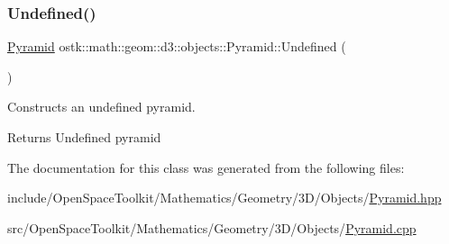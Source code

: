 \subsubsection{\texorpdfstring{Undefined()}{Undefined()}}
{\footnotesize\ttfamily \hyperlink{classostk_1_1math_1_1geom_1_1d3_1_1objects_1_1_pyramid}{Pyramid} ostk\+::math\+::geom\+::d3\+::objects\+::\+Pyramid\+::\+Undefined (\begin{DoxyParamCaption}{ }\end{DoxyParamCaption})\hspace{0.3cm}{\ttfamily [static]}}



Constructs an undefined pyramid. 

\begin{DoxyReturn}{Returns}
Undefined pyramid 
\end{DoxyReturn}


The documentation for this class was generated from the following files\+:\begin{DoxyCompactItemize}
\item 
include/\+Open\+Space\+Toolkit/\+Mathematics/\+Geometry/3\+D/\+Objects/\hyperlink{_pyramid_8hpp}{Pyramid.\+hpp}\item 
src/\+Open\+Space\+Toolkit/\+Mathematics/\+Geometry/3\+D/\+Objects/\hyperlink{_pyramid_8cpp}{Pyramid.\+cpp}\end{DoxyCompactItemize}
